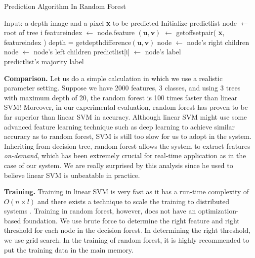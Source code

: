 \begin{algorithm}
 \caption{Prediction Algorithm In Random Forest}
 \label{alg: RF}
\begin{algorithmic}

\State Input: a depth image and a pixel \textbf{x} to be predicted
\State Initialize predict\textunderscore list
     \State node $\leftarrow$ root of tree i
	   \State feature\textunderscore index $\gets$ node.feature
       \State $(\textbf{u}, \textbf{v})$ $\gets$ get\textunderscore offset\textunderscore pair( \textbf{x}, feature\textunderscore index )
	   \State depth = get\textunderscore depth\textunderscore difference$(\textbf{u}, \textbf{v})$
	      \State node $\gets$ node's right children	
	   \Else
	      \State node $\gets$ node's left children
       \EndIf
    \EndWhile
    \State predict\textunderscore list[i] $\gets$ node's label
  \EndFor
\\
\Return predict\textunderscore list's majority label
 
\end{algorithmic}
\end{algorithm}

\textbf{Comparison.} Let us do a simple calculation in which we use a realistic parameter setting. Suppose we have 2000 features, 3 classes, and using 3 trees with maximum depth of 20, the random forest is 100 times faster than linear SVM! Moreover, in our experimental evaluation, random forest has proven to be far superior than linear SVM in accuracy. Although linear SVM might use some advanced feature learning technique such as deep learning to achieve similar accuracy as to random forest, SVM is still too slow for us to adopt in the system. Inheriting from decision tree, random forest allows the system to extract features \textit{on-demand}, which has been extremely crucial for real-time application as in the case of our system. We are really surprised by this analysis since he used to believe linear SVM is unbeatable in practice.

\textbf{Training.} Training in linear SVM is very fast as it has a run-time complexity of $O(n\times l)$ and there exists a technique to scale the training to distributed systems \cite{michael}. Training in random forest, however, does not have an optimization-based foundation. We use brute force to determine the right feature and right threshold for each node in the decision forest. In determining the right threshold, we use grid search. In the training of random forest, it is highly recommended to put the training data in the main memory.


